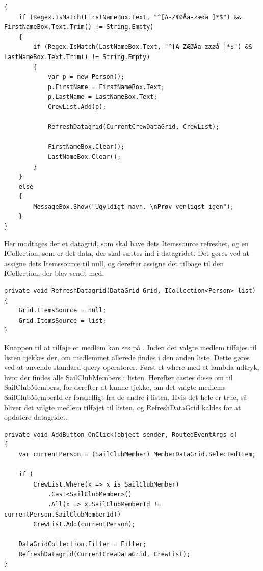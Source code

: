 \begin{lstlisting}[frame=single, caption=Add Guest Buttton, label=AddGuestButton]
{
    if (Regex.IsMatch(FirstNameBox.Text, "^[A-ZÆØÅa-zæøå ]*$") && FirstNameBox.Text.Trim() != String.Empty)
    {
        if (Regex.IsMatch(LastNameBox.Text, "^[A-ZÆØÅa-zæøå ]*$") && LastNameBox.Text.Trim() != String.Empty)
        {
            var p = new Person();
            p.FirstName = FirstNameBox.Text;
            p.LastName = LastNameBox.Text;
            CrewList.Add(p);

            RefreshDatagrid(CurrentCrewDataGrid, CrewList);

            FirstNameBox.Clear();
            LastNameBox.Clear();
        }
    }
    else
    {
        MessageBox.Show("Ugyldigt navn. \nPrøv venligst igen");
    }
}      
\end{lstlisting}

Her modtages der et datagrid, som skal have dets Itemssource refreshet, og en ICollection, som er det data, der skal sættes ind i datagridet. 
Det gøres ved at assigne dets Itemssource til null, og derefter assigne det tilbage til den ICollection, der blev sendt med. 

\begin{lstlisting}[frame=single, caption=Refresh Datagrid, label=RefreshDatagrid]
private void RefreshDatagrid(DataGrid Grid, ICollection<Person> list)
{
    Grid.ItemsSource = null;
    Grid.ItemsSource = list;
}
\end{lstlisting}

Knappen til at tilføje et medlem kan ses på .
Inden det valgte medlem tilføjes til listen tjekkes der, om medlemmet allerede findes i den anden liste. 
Dette gøres ved at anvende standard query operatorer. 
Først et where med et lambda udtryk, hvor der findes alle SailClubMembers i listen. 
Herefter castes disse om til SailClubMembers, for derefter at kunne tjekke, om det valgte medlems SailClubMemberId er forskelligt fra de andre i listen. 
Hvis det hele er true, så bliver det valgte medlem tilføjet til listen, og RefreshDataGrid kaldes for at opdatere datagridet.

\begin{lstlisting}[frame=single, caption=Add Member, label=AddMember]
private void AddButton_OnClick(object sender, RoutedEventArgs e)
{
    var currentPerson = (SailClubMember) MemberDataGrid.SelectedItem;

    if (
        CrewList.Where(x => x is SailClubMember)
            .Cast<SailClubMember>()
            .All(x => x.SailClubMemberId != currentPerson.SailClubMemberId))
        CrewList.Add(currentPerson);

    DataGridCollection.Filter = Filter; 
    RefreshDatagrid(CurrentCrewDataGrid, CrewList);
}
\end{lstlisting}

